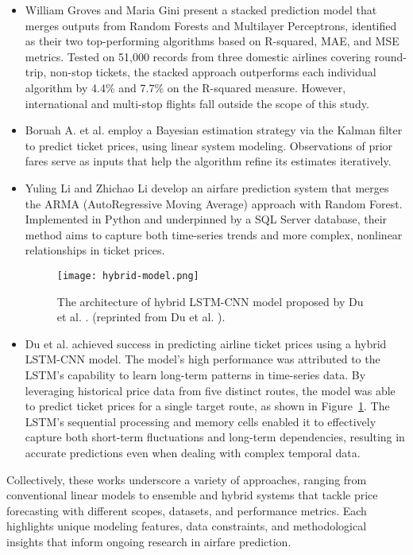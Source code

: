 \documentclass[conference]{IEEEtran}
\begin{document}
\begin{itemize}
    \item William Groves and Maria Gini \cite{b8} present a stacked prediction model that merges outputs from Random Forests and Multilayer Perceptrons, identified as their two top-performing algorithms based on R-squared, MAE, and MSE metrics. Tested on 51,000 records from three domestic airlines covering round-trip, non-stop tickets, the stacked approach outperforms each individual algorithm by 4.4\% and 7.7\% on the R-squared measure. However, international and multi-stop flights fall outside the scope of this study.
    \item Boruah A. et al. \cite{b9} employ a Bayesian estimation strategy via the Kalman filter to predict ticket prices, using linear system modeling. Observations of prior fares serve as inputs that help the algorithm refine its estimates iteratively.
    \item Yuling Li and Zhichao Li \cite{b10} develop an airfare prediction system that merges the ARMA (AutoRegressive Moving Average) approach with Random Forest. Implemented in Python and underpinned by a SQL Server database, their method aims to capture both time-series trends and more complex, nonlinear relationships in ticket prices.

\begin{figure}[htbp]
\centerline{\texttt{[image: hybrid-model.png]}}
\caption{The architecture of hybrid LSTM-CNN model proposed by Du et al. \cite{b11}. (reprinted from Du et al. \cite{b11}).}
\label{fig:hybrid-model-original}
\end{figure}
    
    \item Du et al. \cite{b11} achieved success in predicting airline ticket prices using a hybrid LSTM-CNN model. The model's high performance was attributed to the LSTM's capability to learn long-term patterns in time-series data. By leveraging historical price data from five distinct routes, the model was able to predict ticket prices for a single target route, as shown in Figure~\ref{fig:hybrid-model-original}. The LSTM's sequential processing and memory cells enabled it to effectively capture both short-term fluctuations and long-term dependencies, resulting in accurate predictions even when dealing with complex temporal data.

\end{itemize}

Collectively, these works underscore a variety of approaches, ranging from conventional linear models to ensemble and hybrid systems that tackle price forecasting with different scopes, datasets, and performance metrics. Each highlights unique modeling features, data constraints, and methodological insights that inform ongoing research in airfare prediction. 
\end{document}
